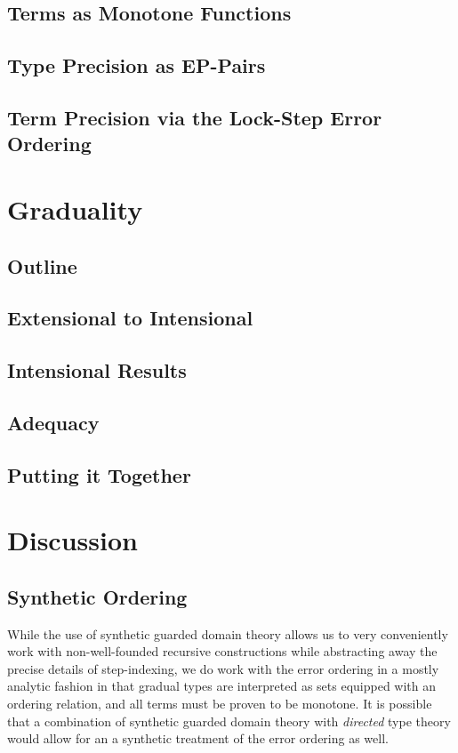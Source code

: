 \documentclass[acmsmall,screen]{acmart}
\begin{document}
\subsection{Terms as Monotone Functions}


\subsection{Type Precision as EP-Pairs}


\subsection{Term Precision via the Lock-Step Error Ordering}


\section{Graduality}\label{sec:graduality}

\subsection{Outline}

\subsection{Extensional to Intensional}

\subsection{Intensional Results}

\subsection{Adequacy}

\subsection{Putting it Together}



\section{Discussion}\label{sec:discussion}

\subsection{Synthetic Ordering}

While the use of synthetic guarded domain theory allows us to very
conveniently work with non-well-founded recursive constructions while
abstracting away the precise details of step-indexing, we do work with
the error ordering in a mostly analytic fashion in that gradual types
are interpreted as sets equipped with an ordering relation, and all
terms must be proven to be monotone.
%
It is possible that a combination of synthetic guarded domain theory
with \emph{directed} type theory would allow for an a synthetic
treatment of the error ordering as well.




\end{document}
